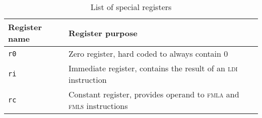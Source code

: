 \begin{table}[h]
	\centering
	\begin{tabular}{|l l|}
		\hline
		\textbf{Register name} & \textbf{Register purpose} \\
		\hline
		\texttt{r0} & Zero register, hard coded to always contain 0 \\
		\texttt{ri} & Immediate register, contains the result of an \textsc{ldi} instruction\\
		\texttt{rc} & Constant register, provides operand to \textsc{fmla} and \textsc{fmls} instructions \\
		\hline
	\end{tabular}

	\caption{List of special registers}
	\label{tab:specregs}
\end{table}

